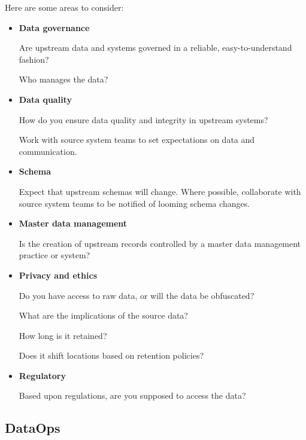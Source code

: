 Here are some areas to consider:
\begin{itemize}
    \item \textbf{Data governance}
    
    \noindent
    Are upstream data and systems governed in a reliable,
    easy-to-understand fashion?

    Who manages the data?


    \item \textbf{Data quality}
    
    \noindent
    How do you ensure data quality and integrity in upstream
    systems?
    
    Work with source system teams to set expectations on data
    and communication.


    \item \textbf{Schema}
    
    \noindent
    Expect that upstream schemas will change. Where possible,
    collaborate with source system teams to be notified of
    looming schema changes.


    \item \textbf{Master data management}
    
    \noindent
    Is the creation of upstream records controlled by a master
    data management practice or system?


    \item \textbf{Privacy and ethics}
    
    \noindent
    Do you have access to raw data, or will the data be obfuscated?
    
    What are the implications of the source data?
    
    How long is it retained?
    
    Does it shift locations based on retention policies?


    \item \textbf{Regulatory}
    
    \noindent
    Based upon regulations, are you supposed to access the data?

\end{itemize}



\subsection*{DataOps}



